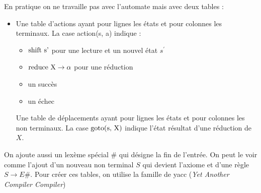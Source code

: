 \documentclass{cours}
\begin{document}
En pratique on ne travaille pas avec l'automate mais avec deux tables : 
\begin{itemize}
    \item Une table d'actions ayant pour lignes les états et pour colonnes les terminaux. La case \textmd{action(s, a)} indique : 
    \begin{itemize}
        \item $\textmd{shift s'}$ pour une lecture et un nouvel état $s^{'}$
        \item $\textmd{reduce X} \rightarrow \alpha$ pour une réduction
        \item un succès
        \item un échec
    \end{itemize}
    Une table de déplacements ayant pour lignes les états et pour colonnes les non terminaux. La case $\textmd{goto(s, X)}$ indique l'état résultat d'une réduction de $X$.
\end{itemize}
On ajoute aussi un lexème spécial \# qui désigne la fin de l'entrée. On peut le voir comme l'ajout d'un nouveau non terminal $S$ qui devient l'axiome et d'une règle $S \rightarrow E \#$.
Pour créer ces tables, on utilise la famille de \textmd{yacc} (\textit{Yet Another Compiler Compiler})
\end{document}
